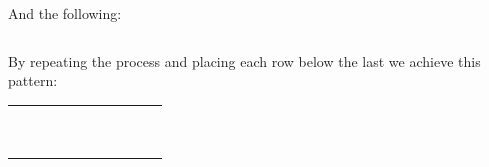 \documentclass[a4paper,11pt]{report}
\begin{document}
And the following:

\begin{center}
\begin{tabular}{|c|c|c|c|c|c|c|c|c|c|c|}
 \hline
 \cellcolor{black} & \cellcolor{black} & \cellcolor{black} & & \cellcolor{black} & & & \cellcolor{black} & \cellcolor{black} & & \cellcolor{black} \\
 \hline
\end{tabular}
\end{center}

By repeating the process and placing each row below the last we achieve this pattern:

\begin{center}
\begin{tabular}{|c|c|c|c|c|c|c|c|c|c|c|}
 \hline
 \cellcolor{black} & & \cellcolor{black} & \cellcolor{black} & & & & \cellcolor{black} & & \cellcolor{black} & \cellcolor{black} \\ \hline
 \cellcolor{black} & & & \cellcolor{black} & \cellcolor{black} & & \cellcolor{black} & \cellcolor{black} & & & \cellcolor{black}\\ \hline
 \cellcolor{black} & \cellcolor{black} & \cellcolor{black} & & \cellcolor{black} & & & \cellcolor{black} & \cellcolor{black} & & \cellcolor{black} \\ \hline
 & & \cellcolor{black} & & \cellcolor{black} & \cellcolor{black} & \cellcolor{black} & & \cellcolor{black} & & \cellcolor{black} \\ \hline
 & \cellcolor{black} & \cellcolor{black} & & & & \cellcolor{black} & & \cellcolor{black} & & \cellcolor{black} \\ \hline
 \cellcolor{black} & & \cellcolor{black} & \cellcolor{black} & & \cellcolor{black} & \cellcolor{black} & & \cellcolor{black} & & \cellcolor{black} \\ \hline
 \cellcolor{black} & & & \cellcolor{black} & & & \cellcolor{black} & & \cellcolor{black} & & \cellcolor{black} \\ \hline
 \cellcolor{black} & \cellcolor{black} & \cellcolor{black} & \cellcolor{black} & \cellcolor{black} & \cellcolor{black} & \cellcolor{black} & & \cellcolor{black} & & \cellcolor{black} \\ \hline
 & & & & & & \cellcolor{black} & & \cellcolor{black} & & \cellcolor{black} \\ \hline
 & & & & & \cellcolor{black} & \cellcolor{black} & & \cellcolor{black} & & \cellcolor{black} \\ \hline
 & & & & \cellcolor{black} & & \cellcolor{black} & & \cellcolor{black} & & \cellcolor{black} \\ \hline
\end{tabular}
\end{center}
\end{document}

